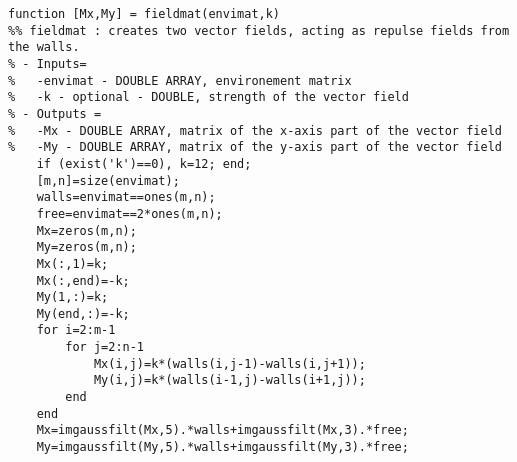{\small
\begin{lstlisting}[caption=Vector Field, frame=single]
function [Mx,My] = fieldmat(envimat,k)
%% fieldmat : creates two vector fields, acting as repulse fields from the walls.
% - Inputs=
%   -envimat - DOUBLE ARRAY, environement matrix
%   -k - optional - DOUBLE, strength of the vector field
% - Outputs =
%   -Mx - DOUBLE ARRAY, matrix of the x-axis part of the vector field
%   -My - DOUBLE ARRAY, matrix of the y-axis part of the vector field
    if (exist('k')==0), k=12; end;
    [m,n]=size(envimat);
    walls=envimat==ones(m,n);
    free=envimat==2*ones(m,n);
    Mx=zeros(m,n);
    My=zeros(m,n);
    Mx(:,1)=k;
    Mx(:,end)=-k;
    My(1,:)=k;
    My(end,:)=-k;
    for i=2:m-1
        for j=2:n-1
            Mx(i,j)=k*(walls(i,j-1)-walls(i,j+1));
            My(i,j)=k*(walls(i-1,j)-walls(i+1,j));
        end
    end
    Mx=imgaussfilt(Mx,5).*walls+imgaussfilt(Mx,3).*free;
    My=imgaussfilt(My,5).*walls+imgaussfilt(My,3).*free;
\end{lstlisting}
}

